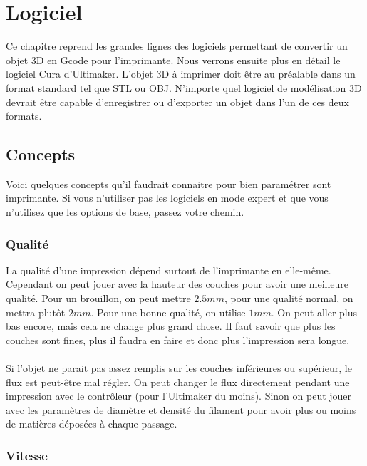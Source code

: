 
\section{Logiciel}

Ce chapitre reprend les grandes lignes des logiciels permettant de convertir un objet 3D en Gcode pour l'imprimante. Nous verrons ensuite plus en détail le logiciel Cura d'Ultimaker. L'objet 3D à imprimer doit être au préalable dans un format standard tel que STL ou OBJ. N'importe quel logiciel de modélisation 3D devrait être capable d'enregistrer ou d'exporter un objet dans l'un de ces deux formats.

\subsection{Concepts}

Voici quelques concepts qu'il faudrait connaitre pour bien paramétrer sont imprimante. Si vous n'utiliser pas les logiciels en mode expert et que vous n'utilisez que les options de base, passez votre chemin.

\subsubsection{Qualité}

La qualité d'une impression dépend surtout de l'imprimante en elle-même. Cependant on peut jouer avec la hauteur des couches pour avoir une meilleure qualité. Pour un brouillon, on peut mettre $2.5mm$, pour une qualité normal, on mettra plutôt $2mm$. Pour une bonne qualité, on utilise $1mm$. On peut aller plus bas encore, mais cela ne change plus grand chose. Il faut savoir que plus les couches sont fines, plus il faudra en faire et donc plus l'impression sera longue.

\paragraph{} Si l'objet ne parait pas assez remplis sur les couches inférieures ou supérieur, le flux est peut-être mal régler. On peut changer le flux directement pendant une impression avec le contrôleur (pour l'Ultimaker du moins). Sinon on peut jouer avec les paramètres de diamètre et densité du filament pour avoir plus ou moins de matières déposées à chaque passage.

\subsubsection{Vitesse}


